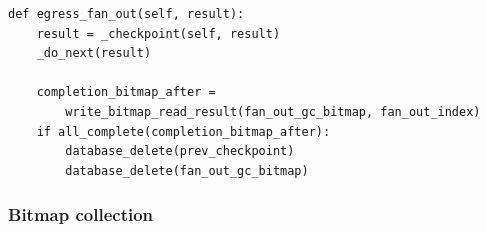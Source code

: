 \begin{verbatim}
def egress_fan_out(self, result):
    result = _checkpoint(self, result)
    _do_next(result)

    completion_bitmap_after =
        write_bitmap_read_result(fan_out_gc_bitmap, fan_out_index)
    if all_complete(completion_bitmap_after):
        database_delete(prev_checkpoint)
        database_delete(fan_out_gc_bitmap)
\end{verbatim}

\subsubsection{Bitmap collection}

%
%
%
%
%
%
